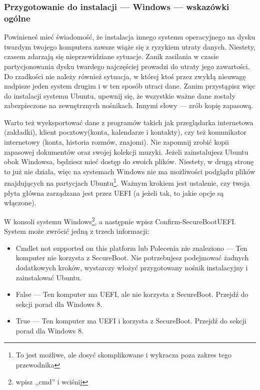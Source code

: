 \subsubsection{Przygotowanie do instalacji --- Windows --- wskazówki ogólne}
\label{sec:przygotowanie_windows}
Powinieneś mieć świadomość, że instalacja innego systemu operacyjnego na dysku twardym twojego komputera zawsze wiąże się z ryzykiem utraty danych. Niestety, czasem zdarzają się nieprzewidziane sytuacje. Zanik zasilania w czasie partycjonowania dysku twardego najczęściej prowadzi do utraty jego zawartości. Do rzadkości nie należy również sytuacja, w której ktoś przez zwykłą nieuwagę  nadpisze jeden system drugim i w ten sposób utraci dane. Zanim przystąpisz więc do instalacji systemu Ubuntu, upewnij się, że wszystkie ważne dane zostały zabezpieczone na zewnętrznych nośnikach. Innymi słowy --- zrób kopię zapasową.

Warto też wyeksportować dane z programów takich jak przeglądarka internetowa (zakładki), klient pocztowy(konta, kalendarze i kontakty), czy też komunikator internetowy (konta, historia rozmów, znajomi). Nie zapomnij zrobić kopii zapasowej dokumentów oraz swojej kolekcji muzyki. Jeżeli zainstalujesz Ubuntu obok Windowsa, będziesz mieć dostęp do swoich plików. Niestety, w drugą stronę to już nie działa, więc na systemach Windows nie ma możliwości podglądu plików znajdujących na partycjach Ubuntu\footnote{To jest możliwe, ale dosyć skomplikowane i wykracza poza zakres tego przewodnika}.
Ważnym krokiem jest ustalenie, czy twoja płyta główna zarządzana jest przez UEFI (a jeżeli tak, to jakie opcje są włączone).

W konsoli systemu Windows\footnote{ wpisz ,,cmd'' i wciśnij \keys{\returnwin} }, a następnie wpisz \textcolor{ubuntu_orange}{Confirm-SecureBootUEFI}. System może zwrócić jedną z trzech informacji:
\begin{itemize}
\item \textcolor{ubuntu_orange}{Cmdlet not supported on this platform} lub \textcolor{ubuntu_orange}{Polecenia nie znaleziono} --- Ten komputer nie korzysta z SecureBoot. Nie potrzebujesz podejmować żadnych dodatkowych kroków, wystarczy włożyć przygotowany nośnik instalacyjny i zainstalować Ubuntu.
\item \textcolor{ubuntu_orange}{False} --- Ten komputer ma UEFI, ale nie korzysta z SecureBoot. Przejdź do sekcji porad dla Windows 8.
\item \textcolor{ubuntu_orange}{True} --- Ten komputer ma UEFI i korzysta z SecureBoot. Przejdź do sekcji porad dla Windows 8.
\end{itemize}
